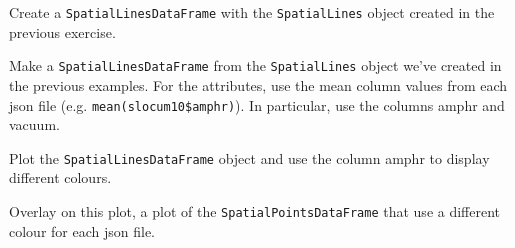 \documentclass[11pt, oneside]{article}   	%
\begin{document}
\begin{Exercise}
Create a \texttt{SpatialLinesDataFrame} with the \texttt{SpatialLines} object created in the previous exercise.

\Question Make a \texttt{SpatialLinesDataFrame} from the \texttt{SpatialLines} object we've created in the previous examples. For the attributes, use the mean column values from each json file (e.g. \texttt{mean(slocum10\$amphr)}). In particular, use the  columns amphr and vacuum.

\Question Plot the \texttt{SpatialLinesDataFrame} object and use the column amphr to display different colours.

\Question Overlay on this plot, a plot of the \texttt{SpatialPointsDataFrame} that use a different colour for each json file.

\end{Exercise}
\end{document}
